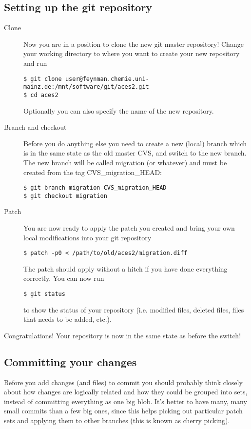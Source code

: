 \documentclass[a4paper,10pt]{article}
\begin{document}
\subsection{Setting up the git repository}
\begin{description}
\item[Clone] Now you are in a position to clone the new git master repository!
Change your working directory to where you want to create your new repository
and run
\begin{verbatim}
$ git clone user@feynman.chemie.uni-mainz.de:/mnt/software/git/aces2.git
$ cd aces2 
\end{verbatim}
Optionally you can also specify the name of the new repository.
\item[Branch and checkout] 
Before you do anything else you need to create a new (local) branch which is
in the same state as the old master CVS, and switch to the new branch. The new
branch will be called migration (or whatever) and must be created from the tag
CVS\_migration\_HEAD:
\begin{verbatim}
$ git branch migration CVS_migration_HEAD
$ git checkout migration
\end{verbatim}
\item[Patch] You are now ready to apply the patch you created and bring your
own local modifications into your git repository
\begin{verbatim}
$ patch -p0 < /path/to/old/aces2/migration.diff
\end{verbatim}
The patch should apply without a hitch if you have done everything correctly.
You can now run 
\begin{verbatim}
$ git status
\end{verbatim}
to show the status of your repository (i.e. modified files, deleted files,
files that needs to be added, etc.).
\end{description}

Congratulations! Your repository is now in the same state as before the 
switch!
\subsection{Committing your changes}
Before you add changes (and files) to
commit you should probably think closely about how changes are logically
related and how they could be grouped into sets, instead of committing
everything as one big blob. It's better to have many, many small commits than
a few big ones, since this helps picking out particular patch sets and
applying them to other branches (this is known as cherry picking).
\end{document}
